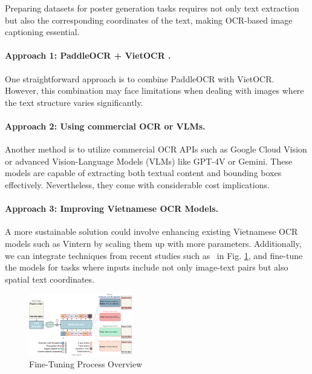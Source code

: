 \documentclass[conference]{IEEEtran}
\begin{document}
Preparing datasets for poster generation tasks requires not only text extraction but also the corresponding coordinates of the text, making OCR-based image captioning essential.

\paragraph{Approach 1: PaddleOCR \cite{paddleocr2021} + VietOCR \cite{vietocr2020}.} One straightforward approach is to combine PaddleOCR with VietOCR. However, this combination may face limitations when dealing with images where the text structure varies significantly.

\paragraph{Approach 2: Using commercial OCR or VLMs.} Another method is to utilize commercial OCR APIs such as Google Cloud Vision or advanced Vision-Language Models (VLMs) like GPT-4V or Gemini. These models are capable of extracting both textual content and bounding boxes effectively. Nevertheless, they come with considerable cost implications.

\paragraph{Approach 3: Improving Vietnamese OCR Models.} A more sustainable solution could involve enhancing existing Vietnamese OCR models such as Vintern \cite{doan2024vintern1befficientmultimodallarge} by scaling them up with more parameters. Additionally, we can integrate techniques from recent studies such as~\cite{hamdi2025vistaocrgenerativeinteractiveend} in Fig. \ref{fig:piplelineofvistaOCR}, and fine-tune the models for tasks where inputs include not only image-text pairs but also spatial text coordinates.
\begin{figure}[h!]
	\centering
	\includegraphics[width=0.4\textwidth]{pipeline.pdf} %
	\caption{Fine-Tuning Process Overview}
	\label{fig:piplelineofvistaOCR}
\end{figure}
\end{document}

